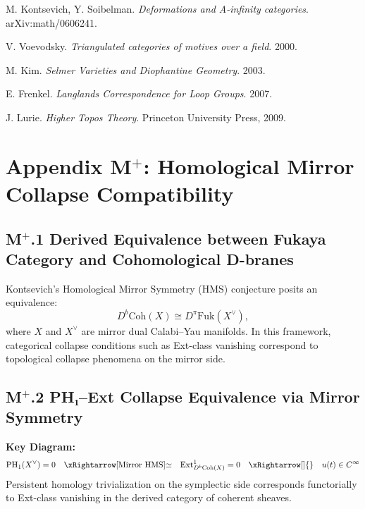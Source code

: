 \documentclass[11pt]{article}
\begin{document}
\begin{axiom}
\begin{axiom}
{{\begin{thebibliography}{9}
M. Kontsevich, Y. Soibelman.  
\textit{Deformations and A-infinity categories}. arXiv:math/0606241.

V. Voevodsky.  
\textit{Triangulated categories of motives over a field}. 2000.

M. Kim.  
\textit{Selmer Varieties and Diophantine Geometry}. 2003.

E. Frenkel.  
\textit{Langlands Correspondence for Loop Groups}. 2007.

J. Lurie.  
\textit{Higher Topos Theory}. Princeton University Press, 2009.

\end{thebibliography}



\section*{Appendix M$^+$: Homological Mirror Collapse Compatibility}

\subsection*{M$^+$.1 Derived Equivalence between Fukaya Category and Cohomological D-branes}
Kontsevich's Homological Mirror Symmetry (HMS) conjecture posits an equivalence:
\[
D^b\mathrm{Coh}(X) \cong D^\pi\mathrm{Fuk}(X^\vee),
\]
where \( X \) and \( X^\vee \) are mirror dual Calabi–Yau manifolds. In this framework, categorical collapse conditions such as Ext-class vanishing correspond to topological collapse phenomena on the mirror side.

\subsection*{M$^+$.2 PH₁–Ext Collapse Equivalence via Mirror Symmetry}
\textbf{Key Diagram:}
\[
\mathrm{PH}_1(X^\vee) = 0 \quad \xRightarrow[\text{Mirror HMS}]{\simeq} \quad \mathrm{Ext}^1_{D^b\mathrm{Coh}(X)} = 0 \quad \xRightarrow[]{} \quad u(t) \in C^\infty
\]
Persistent homology trivialization on the symplectic side corresponds functorially to Ext-class vanishing in the derived category of coherent sheaves.

}}
\end{axiom}
\end{axiom}
\end{document}
